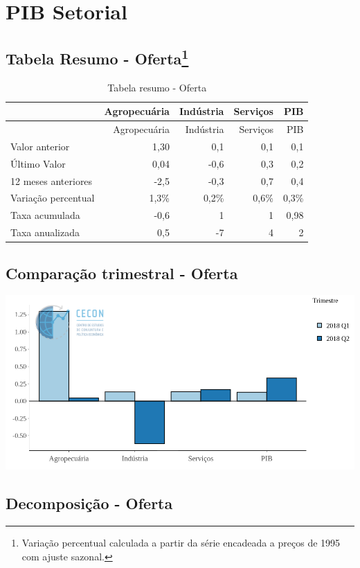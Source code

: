 \documentclass[11pt,portuguese,]{article}
\let\rmarkdownfootnote\footnote%
\def\footnote{\protect\rmarkdownfootnote}
\begin{document}
\section{PIB Setorial}\label{pib-setorial}

\subsection[Tabela Resumo - Oferta]{\texorpdfstring{Tabela Resumo -
Oferta\footnote{Variação percentual calculada a partir da série
  encadeada a preços de 1995 com ajuste sazonal.}}{Tabela Resumo - Oferta}}\label{tabela-resumo---oferta2}

\begin{longtable}[]{@{}lrrrr@{}}
\caption{Tabela resumo - Oferta}\tabularnewline
\toprule
& Agropecuária & Indústria & Serviços & PIB\tabularnewline
\midrule
\endfirsthead
\toprule
& Agropecuária & Indústria & Serviços & PIB\tabularnewline
\midrule
\endhead
Valor anterior & 1,30 & 0,1 & 0,1 & 0,1\tabularnewline
Último Valor & 0,04 & -0,6 & 0,3 & 0,2\tabularnewline
12 meses anteriores & -2,5 & -0,3 & 0,7 & 0,4\tabularnewline
Variação percentual & 1,3\% & 0,2\% & 0,6\% & 0,3\%\tabularnewline
Taxa acumulada & -0,6 & 1 & 1 & 0,98\tabularnewline
Taxa anualizada & 0,5 & -7 & 4 & 2\tabularnewline
\bottomrule
\end{longtable}

\subsection{Comparação trimestral -
Oferta}\label{comparacao-trimestral---oferta}

\begin{center}\includegraphics[width=1\linewidth]{Grafico_Setores} \end{center}

\subsection{Decomposição - Oferta}\label{decomposicao---oferta}
\end{document}

